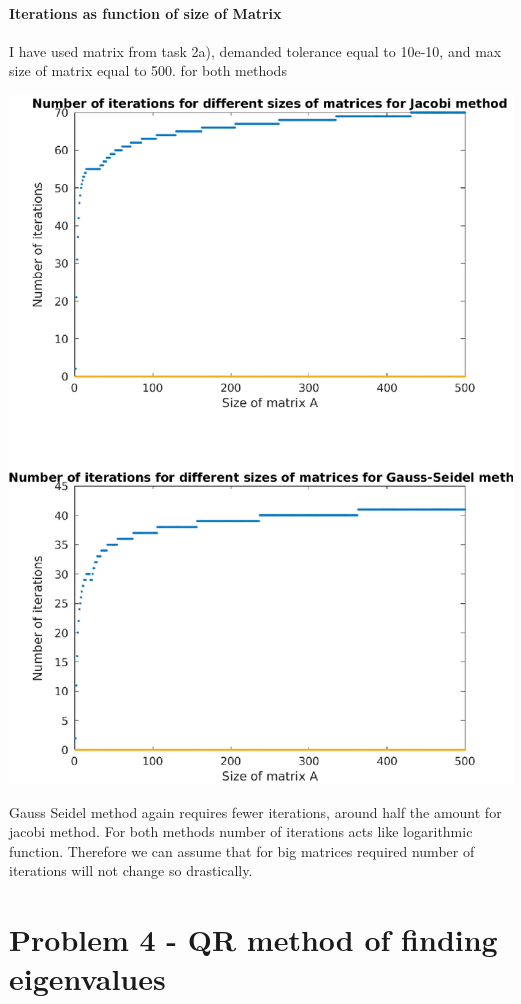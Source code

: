 \documentclass[12pt]{report}
\begin{document}
\subsubsection{Iterations as function of size of Matrix}
I have used matrix from task 2a), demanded tolerance equal to 10e-10, and max size of matrix equal to 500. for both methods
\begin{center}
   \includegraphics[scale=0.75]{iterations.eps}
\end{center}
Gauss Seidel method again requires fewer iterations, around half the amount for jacobi method. For both methods number of iterations acts like logarithmic function. Therefore we can assume that for big matrices required number of iterations will not change so drastically.

\chapter{Problem 4 - QR method of finding eigenvalues}
\end{document}
